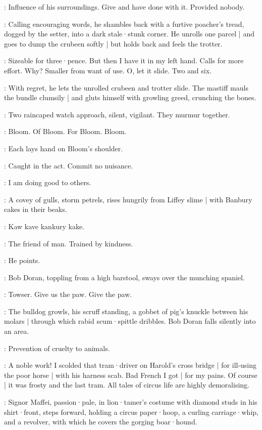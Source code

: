 \Bloom:
Influence of his surroundings.
Give and have done with it.
Provided nobody.

:
Calling encouraging words,
he shambles back with a furtive poacher's tread,
dogged by the setter,
into a dark stale·stunk corner.
He unrolls one parcel |
and goes to dump the crubeen softly |
but holds back and feels the trotter.

\Bloom:
Sizeable for three·pence.
But then I have it in my left hand.
Calls for more effort.
Why?
Smaller from want of use.
O,
let it slide.
Two and six.

:
With regret,
he lets the unrolled crubeen and trotter slide.
The mastiff mauls the bundle clumsily |
and gluts himself with growling greed,
crunching the bones.

:
Two raincaped watch approach,
silent,
vigilant.
They murmur together.

\Watch:
Bloom.
Of Bloom.
For Bloom.
Bloom.

:
Each lays hand on Bloom's shoulder.

\FirstWatch[1]:
Caught in the act.
Commit no nuisance.

\Bloom:
I am doing good to others.

:
A covey of gulls,
storm petrels,
rises hungrily from Liffey slime |
with Banbury cakes in their beaks.

\Gulls:
Kaw kave kankury kake.

\Bloom:
The friend of man.
Trained by kindness.

:
He points.

:
Bob Doran,
toppling from a high barstool,
sways over the munching spaniel.%

\Doran:
Towser.
Give us the paw.
Give the paw.

:
The bulldog growls,
his scruff standing,
a gobbet of pig's knuckle between his molars |
through which rabid scum·spittle dribbles.
Bob Doran falls silently into an area.

\SecondWatch[2]:
Prevention of cruelty to animals.

\Bloom:
A noble work!
I scolded that tram·driver on Harold's cross bridge |
for ill-using the poor horse |
with his harness scab.
Bad French I got |
for my pains.
Of course |
it was frosty and the last tram.
All tales of circus life are highly demoralising.

:
Signor Maffei,
passion·pale,
in lion·tamer's costume with diamond studs in his shirt·front,
steps forward,
holding a circus paper·hoop,
a curling carriage·whip,
and a revolver,
with which he covers the gorging boar·hound.


